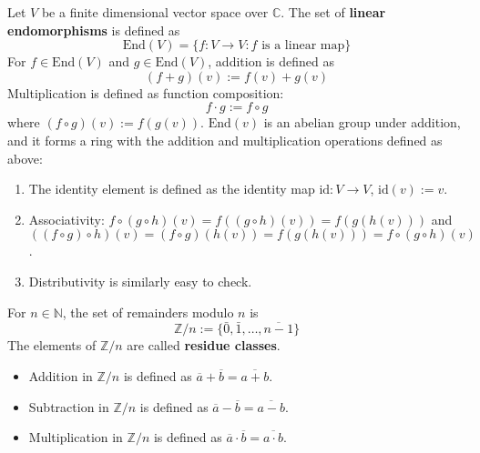 \begin{example}
	Let $V$ be a finite dimensional vector space over $\mathbb{C}$. The set of \textbf{linear endomorphisms} is defined as
	\[
		\text{End}(V) = \{ f: V \rightarrow V : f \text{ is a linear map} \}
	\]
	For $f \in \text{End}(V)$ and $g \in \text{End}(V)$, addition is defined as
	\[
		(f + g)(v) := f(v) + g(v)
	\]
	Multiplication is defined as function composition:
	\[
		f \cdot g := f \circ g
	\]
	where $(f \circ g)(v) := f(g(v))$. $\text{End}(v)$ is an abelian group under addition, and it forms a ring with the addition and multiplication operations defined as above:
	\begin{enumerate}
		\item The identity element is defined as the identity map $\text{id}: V \rightarrow V$, $\text{id}(v) := v$.
		\item Associativity: $f \circ (g \circ h) (v) = f((g \circ h)(v)) = f(g(h(v)))$ and $((f \circ g) \circ h) (v) = (f \circ g) (h(v)) = f(g(h(v))) = f \circ (g \circ h) (v)$.
		\item Distributivity is similarly easy to check.
	\end{enumerate}
\end{example}

\begin{definition}
	For $n \in \mathbb{N}$, the set of remainders modulo $n$ is
	\[
		\mathbb{Z} / n := \{ \bar{0}, \bar{1}, \dots, \overline{n - 1} \}
	\]
	The elements of $\mathbb{Z} / n$ are called \textbf{residue classes}.
\end{definition}

\begin{definition}
	\hfill
	\begin{itemize}
		\item Addition in $\mathbb{Z} / n$ is defined as $\overline{a} + \overline{b} = \overline{a + b}$.
		\item Subtraction in $\mathbb{Z} / n$ is defined as $\overline{a} - \overline{b} = \overline{a - b}$.
		\item Multiplication in $\mathbb{Z} / n$ is defined as $\overline{a} \cdot \overline{b} = \overline{a \cdot b}$.
	\end{itemize}
\end{definition}

